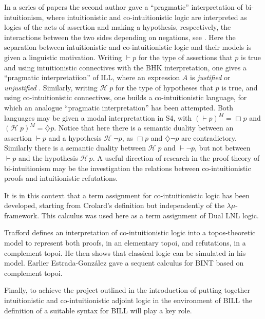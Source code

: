 In a series of papers the second author gave a ``pragmatic''
interpretation of bi-intuitionism, where intuitionistic and
co-intuitionistic logic are interpreted as logics of the acts of
assertion and making a hypothesis, respectively, the interactions
between the two sides depending on negations, see \cite{Bellin:2014}.
Here the separation between intuitionistic and co-intuitionistic logic
and their models is given a linguistic motivation. Writing $\vdash p$
for the type of assertions that $p$ is true and using intuitionistic
connectives with the BHK interpretation, one gives a ``pragmatic
interpretatiion'' of ILL, where an expression $A$ is \emph{justified}
or \emph{unjustified} \cite{dalla1995pragmatic}. Similarly, writing
$\mathcal{H}\; p$ for the type of hypotheses that $p$ is true, and
using co-intuitionistic connectives, one builds a co-intuitionistic
language, for which an analogue ``pragmatic interpretation'' has been
attempted.  Both languages may be given a modal interpretattion in S4,
with $(\vdash p)^M = \Box p$ and $(\mathcal{H}\; p)^M = \diamondsuit
p$. Notice that here there is a semantic duality between an assertion
$\vdash p$ and a hypothesis $\mathcal{H}\; \neg p$, as $\Box p$ and
$\diamondsuit \neg p$ are contradictory. Similarly there is a semantic
duality between $\mathcal{H}\; p$ and $\vdash \neg p$, but not between
$\vdash p$ and the hypothesis $\mathcal{H}\, p$. A useful direction of
research in the proof theory of bi-intuitionism may be the
investigation the relations between co-intuitionistic proofs and
intuitionistic refutations.

It is in this context that a term assignment for co-intuitionistic  logic 
has been developed, starting from Crolard's definition but independently
of the $\lambda\mu$-framework. This calculus was used
here as a term assignment of Dual LNL logic.

Trafford \cite{trafford2016structuring} defines an interpretation of
co-intuitionistic logic into a topos-theoretic model to represent both
proofs, in an elementary topoi, and refutations, in a complement
topoi.  He then shows that classical logic can be simulated in his
model.  Earlier Estrada-Gonz\'alez \cite{estrada2010complement} gave a
sequent calculus for BINT based on complement topoi.

Finally, to achieve the project outlined in the introduction of putting
together intuitionistic and co-intuitionistic adjoint logic in the
environment of BILL the definition of a suitable syntax for BILL will
play a key role.

